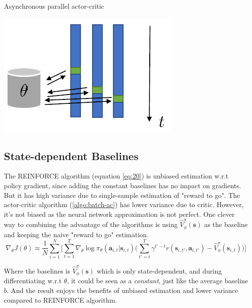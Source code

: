 \documentclass{tufte-handout}
\newcommand{\s}{\mathbf{s}}
\newcommand{\act}{\mathbf{a}}
\begin{document}
\begin{marginfigure}
\caption{Asynchronous parallel actor-critic}
\includegraphics[width=\linewidth]{async}
\label{fig:async}
\end{marginfigure}

\subsection{State-dependent Baselines}

The REINFORCE algorithm (equation \ref{eq:20}) is unbiased estimation w.r.t policy gradient, since adding the constant baselines has no impact on gradients.
But it has high variance due to single-sample estimation of "reward to go". The actor-critic algorithm (\ref{algo:batch-ac}) has lower variance due to critic. However, it's not biased as the neural network approximation is not perfect. One clever way to combining the advantage of the algorithms is using
$\hat{V}_\phi ^ \pi (\s)$ as the baseline and keeping the naive "reward to go" estimation.
\begin{equation}
\label{eq:22}
\nabla _\theta J(\theta) \approx \frac{1}{N} \sum_{i=1} ^ {N} \bigg[\sum_{t=1}^T \nabla_\theta \log \pi_\theta(\act_{i,t}| \s_{i,t})
\Big( \sum_{t'=t}^T \gamma ^ {t' - t} r(\s_{i, t'}, \act_{i, t'}) - \hat{V}_\phi ^ \pi (\s_{i,t}) \Big) \bigg]
\end{equation}

Where the baselines is $\hat{V}_\phi ^ \pi (\s)$ which is only state-dependent, and during differentiating w.r.t $\theta$, it could be seen as a
\emph{constant}, just like the average baseline $b$. And the result enjoys the benefits of unbiased estimation and lower variance compared to REINFORCE
algorithm.
\end{document}
